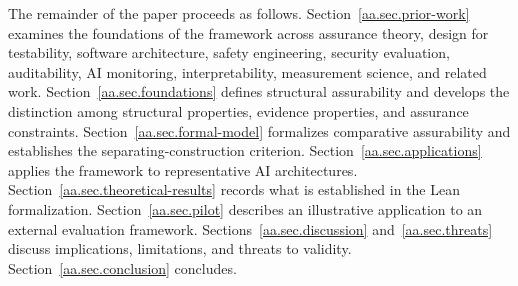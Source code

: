 The remainder of the paper proceeds as follows.
Section~\ref{aa.sec.prior-work} examines the foundations of the framework
across assurance theory, design for testability, software architecture, safety engineering,
security evaluation, auditability, AI monitoring, interpretability, measurement science, and related work.
Section~\ref{aa.sec.foundations} defines structural assurability and develops the distinction among structural properties,
evidence properties, and assurance constraints.
Section~\ref{aa.sec.formal-model} formalizes comparative assurability and establishes the separating-construction criterion.
Section~\ref{aa.sec.applications} applies the framework to representative AI architectures.
Section~\ref{aa.sec.theoretical-results} records what is established in the Lean formalization.
Section~\ref{aa.sec.pilot} describes an illustrative application to an external evaluation framework.
Sections~\ref{aa.sec.discussion} and~\ref{aa.sec.threats} discuss implications, limitations, and threats to validity.
Section~\ref{aa.sec.conclusion} concludes.
